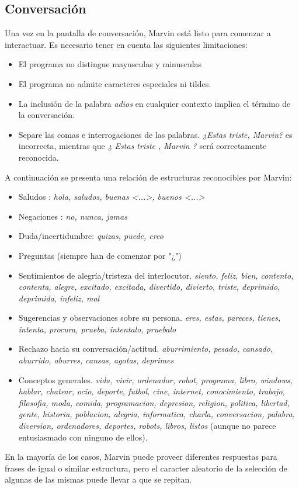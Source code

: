 \documentclass[a4paper]{article}
\begin{document}
		\subsection{Conversación}
		Una vez en la pantalla de conversación, Marvin está listo para comenzar a interactuar. Es necesario tener en cuenta las siguientes limitaciones:
		\begin{itemize}
			\item El programa no distingue mayusculas y minusculas
			\item El programa no admite caracteres especiales ni tildes.
			\item La inclusión de la palabra \emph{adios} en cualquier contexto implica el término de la conversación.
			\item Separe las comas e interrogaciones de las palabras. \emph{¿Estas triste, Marvin?} es incorrecta, mientras que \emph{¿ Estas triste , Marvin ?} será correctamente reconocida.
		\end{itemize}
		
		A continuación se presenta una relación de estructuras reconocibles por Marvin:
		\begin{itemize}
			\item Saludos : \emph{hola, saludos, buenas <...>, buenos <...>}
			\item Negaciones : \emph{no, nunca, jamas}
			\item Duda/incertidumbre: \emph{quizas, puede, creo}
			\item Preguntas (siempre han de comenzar por "¿")
			\item Sentimientos de alegría/tristeza del interlocutor.
				\subitem \emph{siento, feliz, bien, contento, contenta, alegre, excitado, excitada, divertido, divierto, triste, deprimido, deprimida, infeliz, mal}
			\item Sugerencias y observaciones sobre su persona.
				\subitem \emph{eres, estas, pareces, tienes, intenta, procura, prueba, intentalo, pruebalo}
			\item Rechazo hacia su conversación/actitud.
				\subitem \emph{aburrimiento, pesado, cansado, aburrido, aburres, cansas, agotas, deprimes}
			\item Conceptos generales.
				\subitem \emph{vida, vivir, ordenador, robot, programa, libro, windows, hablar, chatear, ocio, deporte, futbol, cine, internet, conocimiento, trabajo, filosofia, moda, comida, programacion, depresion, religion, politica, libertad, gente, historia, poblacion, alegria, informatica, charla, conversacion, palabra, diversion, ordenadores, deportes, robots, libros, listos} (aunque no parece entusiasmado con ninguno de ellos).
		\end{itemize}
		En la mayoría de los casos, Marvin puede proveer diferentes respuestas para frases de igual o similar estructura, pero el caracter aleatorio de la selección de algunas de las mismas puede llevar a que se repitan.
\end{document}
